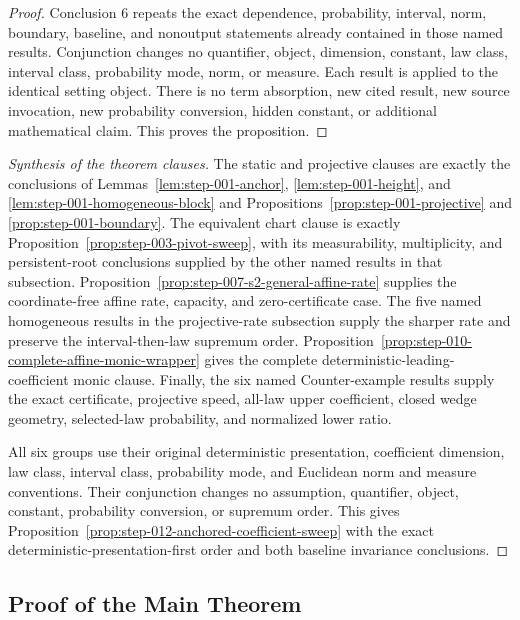 \begin{proof}
Conclusion 6 repeats the exact dependence, probability, interval, norm, boundary, baseline, and nonoutput
statements already contained in those named results. Conjunction changes no quantifier, object, dimension,
constant, law class, interval class, probability mode, norm, or measure. Each result is applied to the
identical setting object. There is no term absorption, new cited result, new source invocation,
new probability conversion, hidden constant, or additional
mathematical claim. This proves the proposition. 
\end{proof}

\begin{proof}[Synthesis of the theorem clauses]
The static and projective clauses are exactly the conclusions of
Lemmas~\ref{lem:step-001-anchor}, \ref{lem:step-001-height}, and
\ref{lem:step-001-homogeneous-block} and
Propositions~\ref{prop:step-001-projective} and
\ref{prop:step-001-boundary}.  The equivalent chart clause is exactly
Proposition~\ref{prop:step-003-pivot-sweep}, with its measurability,
multiplicity, and persistent-root conclusions supplied by the other named
results in that subsection.  Proposition~\ref{prop:step-007-s2-general-affine-rate}
supplies the coordinate-free affine rate, capacity, and zero-certificate
case.  The five named homogeneous results in the projective-rate subsection
supply the sharper rate and preserve the interval-then-law supremum order.
Proposition~\ref{prop:step-010-complete-affine-monic-wrapper} gives the complete
deterministic-leading-coefficient monic clause.
Finally, the six named Counter-example results supply the exact certificate,
projective speed, all-law upper coefficient, closed wedge geometry, selected-law
probability, and normalized lower ratio.

All six groups use their original deterministic presentation, coefficient
dimension, law class, interval class, probability mode, and Euclidean norm
and measure conventions. Their conjunction changes no assumption, quantifier,
object, constant, probability conversion,
or supremum order.  This gives Proposition~\ref{prop:step-012-anchored-coefficient-sweep}
with the exact deterministic-presentation-first order and both baseline
invariance conclusions.
\end{proof}

\subsection{Proof of the Main Theorem}\label{app:main-proof}

